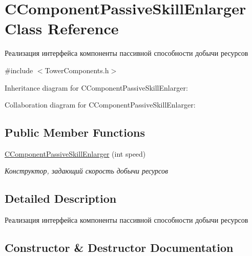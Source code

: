\hypertarget{classCComponentPassiveSkillEnlarger}{}\section{C\+Component\+Passive\+Skill\+Enlarger Class Reference}
\label{classCComponentPassiveSkillEnlarger}


Реализация интерфейса компоненты пассивной способности добычи ресурсов  




{\ttfamily \#include $<$Tower\+Components.\+h$>$}



Inheritance diagram for C\+Component\+Passive\+Skill\+Enlarger\+:


Collaboration diagram for C\+Component\+Passive\+Skill\+Enlarger\+:
\subsection*{Public Member Functions}
\begin{DoxyCompactItemize}
\item 
\hyperlink{classCComponentPassiveSkillEnlarger_ac709a6bae5252c00780780a515a44992}{C\+Component\+Passive\+Skill\+Enlarger} (int speed)
\begin{DoxyCompactList}\small\item\em Конструктор, задающий скорость добычи ресурсов \end{DoxyCompactList}\end{DoxyCompactItemize}


\subsection{Detailed Description}
Реализация интерфейса компоненты пассивной способности добычи ресурсов 

\subsection{Constructor \& Destructor Documentation}
